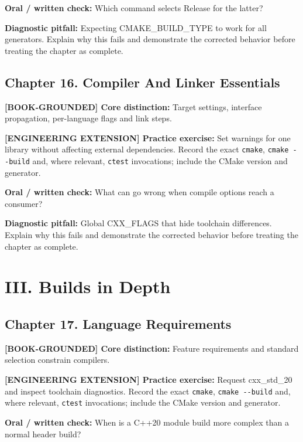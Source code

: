 \documentclass[11pt,letterpaper,oneside]{report}
\providecommand{\passthrough}[1]{#1}
\begin{document}
\textbf{Oral / written check:} Which command selects Release for the
latter?

\textbf{Diagnostic pitfall:} Expecting CMAKE\_BUILD\_TYPE to work for
all generators. Explain why this fails and demonstrate the corrected
behavior before treating the chapter as complete.

\section{Chapter 16. Compiler And Linker
Essentials}\label{chapter-16.-compiler-and-linker-essentials}

\textbf{{[}BOOK-GROUNDED{]} Core distinction:} Target settings,
interface propagation, per-language flags and link steps.

\textbf{{[}ENGINEERING EXTENSION{]} Practice exercise:} Set warnings for
one library without affecting external dependencies. Record the exact
\passthrough{\lstinline!cmake!}, \passthrough{\lstinline!cmake --build!}
and, where relevant, \passthrough{\lstinline!ctest!} invocations;
include the CMake version and generator.

\textbf{Oral / written check:} What can go wrong when compile options
reach a consumer?

\textbf{Diagnostic pitfall:} Global CXX\_FLAGS that hide toolchain
differences. Explain why this fails and demonstrate the corrected
behavior before treating the chapter as complete.

\chapter{III. Builds in Depth}\label{iii.-builds-in-depth}

\section{Chapter 17. Language
Requirements}\label{chapter-17.-language-requirements}

\textbf{{[}BOOK-GROUNDED{]} Core distinction:} Feature requirements and
standard selection constrain compilers.

\textbf{{[}ENGINEERING EXTENSION{]} Practice exercise:} Request
cxx\_std\_20 and inspect toolchain diagnostics. Record the exact
\passthrough{\lstinline!cmake!}, \passthrough{\lstinline!cmake --build!}
and, where relevant, \passthrough{\lstinline!ctest!} invocations;
include the CMake version and generator.

\textbf{Oral / written check:} When is a C++20 module build more complex
than a normal header build?
\end{document}
